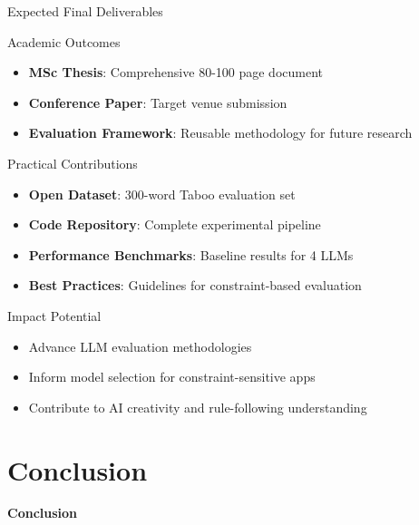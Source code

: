 \documentclass[aspectratio=169]{beamer}
\begin{document}
\begin{frame}{Expected Final Deliverables}
\begin{block}{Academic Outcomes}
\begin{itemize}
    \item \textbf{MSc Thesis}: Comprehensive 80-100 page document
    \item \textbf{Conference Paper}: Target venue submission
    \item \textbf{Evaluation Framework}: Reusable methodology for future research
\end{itemize}
\end{block}

\begin{block}{Practical Contributions}
\begin{itemize}
    \item \textbf{Open Dataset}: 300-word Taboo evaluation set
    \item \textbf{Code Repository}: Complete experimental pipeline
    \item \textbf{Performance Benchmarks}: Baseline results for 4 LLMs
    \item \textbf{Best Practices}: Guidelines for constraint-based evaluation
\end{itemize}
\end{block}

\begin{block}{Impact Potential}
\small
\begin{itemize}
    \item Advance LLM evaluation methodologies
    \item Inform model selection for constraint-sensitive apps
    \item Contribute to AI creativity and rule-following understanding
\end{itemize}
\end{block}
\end{frame}

\section{Conclusion}

\begin{frame}
\begin{center}
\Huge \textbf{Conclusion}
\end{center}
\end{frame}
\end{document}

